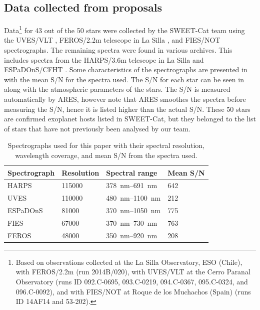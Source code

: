 \subsection{Data collected from proposals}

Data\footnote{Based on observations collected at the La Silla Observatory, ESO (Chile), with
FEROS/2.2m (run 2014B/020), with UVES/VLT at the Cerro Paranal Observatory (runs ID 092.C-0695,
093.C-0219, 094.C-0367, 095.C-0324, and 096.C-0092), and with FIES/NOT at Roque de los Muchachos
(Spain) (runs ID 14AF14 and 53-202).} for 43 out of the 50 stars were collected by the SWEET-Cat
team using the UVES/VLT \citep{UVES}, FEROS/2.2m telescope in La Silla \citep{FEROS}, and FIES/NOT
\citep{FIES} spectrographs. The remaining spectra were found in various archives. This includes
spectra from the HARPS/3.6m telescope in La Silla \citep{HARPS} and ESPaDOnS/CFHT \citep{ESPADONS}.
Some characteristics of the spectrographs are presented in  with the mean S/N
for the spectra used. The S/N for each star can be seen in  along with the
atmospheric parameters of the stars. The S/N is measured automatically by ARES, however note that
ARES smoothes the spectra before measuring the S/N, hence it is listed higher than the actual S/N.
These 50 stars are confirmed exoplanet hosts listed in SWEET-Cat, but they belonged to the list of
stars that have not previously been analysed by our team.


\begin{table}[htb!]
    \caption{Spectrographs used for this paper with their spectral resolution,
             wavelength coverage, and mean S/N from the spectra used.}
    \label{tab:instruments}
    \centering
    \begin{tabular}{llll}
      \hline\hline
      Spectrograph & Resolution    & Spectral range            &   Mean S/N  \\
      \hline
      HARPS        &  \num{115000} & \SIrange{378}{691}{nm}    &   642       \\
      UVES         &  \num{110000} & \SIrange{480}{1100}{nm}   &   212       \\
      ESPaDOnS     &   \num{81000} & \SIrange{370}{1050}{nm}   &   775       \\
      FIES         &   \num{67000} & \SIrange{370}{730}{nm}    &   763       \\
      FEROS        &   \num{48000} & \SIrange{350}{920}{nm}    &   208       \\
      \hline
    \end{tabular}
\end{table}


